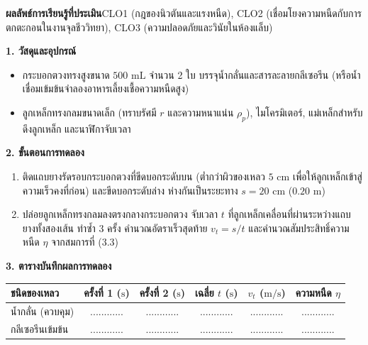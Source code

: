 \begin{labbox}
\noindent\textbf{ผลลัพธ์การเรียนรู้ที่ประเมิน}\quad CLO1 (กฎของนิวตันและแรงหนืด), CLO2 (เชื่อมโยงความหนืดกับการตกตะกอนในงานจุลชีววิทยา), CLO3 (ความปลอดภัยและวินัยในห้องแล็บ)

\vspace{4pt}
\noindent\textbf{1. วัสดุและอุปกรณ์}
\begin{itemize}
    \item กระบอกตวงทรงสูงขนาด $500\text{ mL}$ จำนวน 2 ใบ บรรจุน้ำกลั่นและสารละลายกลีเซอรีน (หรือน้ำเชื่อมเข้มข้นจำลองอาหารเลี้ยงเชื้อความหนืดสูง)
    \item ลูกเหล็กทรงกลมขนาดเล็ก (ทราบรัศมี $r$ และความหนาแน่น $\rho_p$), ไมโครมิเตอร์, แม่เหล็กสำหรับดึงลูกเหล็ก และนาฬิกาจับเวลา
\end{itemize}

\noindent\textbf{2. ขั้นตอนการทดลอง}
\begin{enumerate}
    \item ติดแถบยางรัดรอบกระบอกตวงที่ขีดบอกระดับบน (ต่ำกว่าผิวของเหลว $5\text{ cm}$ เพื่อให้ลูกเหล็กเข้าสู่ความเร็วคงที่ก่อน) และขีดบอกระดับล่าง ห่างกันเป็นระยะทาง $s = 20\text{ cm}$ ($0.20\text{ m}$)
    \item ปล่อยลูกเหล็กทรงกลมลงตรงกลางกระบอกตวง จับเวลา $t$ ที่ลูกเหล็กเคลื่อนที่ผ่านระหว่างแถบยางทั้งสองเส้น ทำซ้ำ 3 ครั้ง คำนวณอัตราเร็วสุดท้าย $v_t = s/t$ และคำนวณสัมประสิทธิ์ความหนืด $\eta$ จากสมการที่ (3.3)
\end{enumerate}

\noindent\textbf{3. ตารางบันทึกผลการทดลอง}
\begin{center}
\footnotesize\setlength{\tabcolsep}{3.5pt}
\begin{tabularx}{\linewidth}{>{\raggedright\arraybackslash}X c c c c c}
\toprule
\textbf{ชนิดของเหลว} & \textbf{ครั้งที่ 1 ($\text{s}$)} & \textbf{ครั้งที่ 2 ($\text{s}$)} & \textbf{เฉลี่ย $t$ ($\text{s}$)} & \textbf{$v_t$ ($\text{m/s}$)} & \textbf{ความหนืด $\eta$} \\
\midrule
น้ำกลั่น (ควบคุม) & ............ & ............ & ............ & ............ & ............ \\
กลีเซอรีนเข้มข้น & ............ & ............ & ............ & ............ & ............ \\
\bottomrule
\end{tabularx}
\end{center}
\end{labbox}

